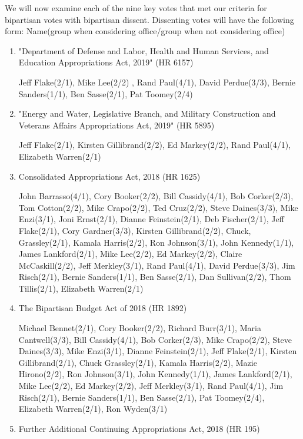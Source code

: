\documentclass[11pt,twocolumn]{article}
\begin{document}
We will now examine each of the nine key votes that met our criteria for bipartisan votes with bipartisan dissent. Dissenting votes will have the following form: Name(group when considering office/group when not considering office)
\begin{enumerate}
\item
"Department of Defense and Labor, Health and Human Services, and Education Appropriations Act, 2019" (HR 6157)

Jeff Flake(2/1), Mike Lee(2/2) , Rand Paul(4/1), David Perdue(3/3), Bernie Sanders(1/1), Ben Sasse(2/1), Pat Toomey(2/4)

\item
"Energy and Water, Legislative Branch, and Military Construction and Veterans Affairs Appropriations Act, 2019" (HR 5895)

Jeff Flake(2/1), Kirsten Gillibrand(2/2), Ed Markey(2/2), Rand Paul(4/1), Elizabeth Warren(2/1)

\item
Consolidated Appropriations Act, 2018 (HR 1625)

John Barrasso(4/1), Cory Booker(2/2), Bill Cassidy(4/1), Bob Corker(2/3), Tom Cotton(2/2), Mike Crapo(2/2), Ted Cruz(2/2), Steve Daines(3/3), Mike Enzi(3/1), Joni Ernst(2/1), Dianne Feinstein(2/1), Deb Fischer(2/1), Jeff Flake(2/1), Cory Gardner(3/3), Kirsten Gillibrand(2/2), Chuck, Grassley(2/1), Kamala Harris(2/2), Ron Johnson(3/1), John Kennedy(1/1), James Lankford(2/1), Mike Lee(2/2), Ed Markey(2/2), Claire McCaskill(2/2), Jeff Merkley(3/1), Rand Paul(4/1), David Perdue(3/3), Jim Risch(2/1), Bernie Sanders(1/1), Ben Sasse(2/1), Dan Sullivan(2/2), Thom Tillis(2/1), Elizabeth Warren(2/1)

\item
The Bipartisan Budget Act of 2018 (HR 1892)

Michael Bennet(2/1), Cory Booker(2/2), Richard Burr(3/1), Maria Cantwell(3/3), Bill Cassidy(4/1), Bob Corker(2/3), Mike Crapo(2/2), Steve Daines(3/3), Mike Enzi(3/1), Dianne Feinstein(2/1), Jeff Flake(2/1), Kirsten Gillibrand(2/1), Chuck Grassley(2/1), Kamala Harris(2/2), Mazie Hirono(2/2), Ron Johnson(3/1), John Kennedy(1/1), James Lankford(2/1), Mike Lee(2/2), Ed Markey(2/2), Jeff Merkley(3/1), Rand Paul(4/1), Jim Risch(2/1), Bernie Sanders(1/1), Ben Sasse(2/1), Pat Toomey(2/4), Elizabeth Warren(2/1), Ron Wyden(3/1)

\item
Further Additional Continuing Appropriations Act, 2018 (HR 195)


\end{enumerate}
\end{document}
